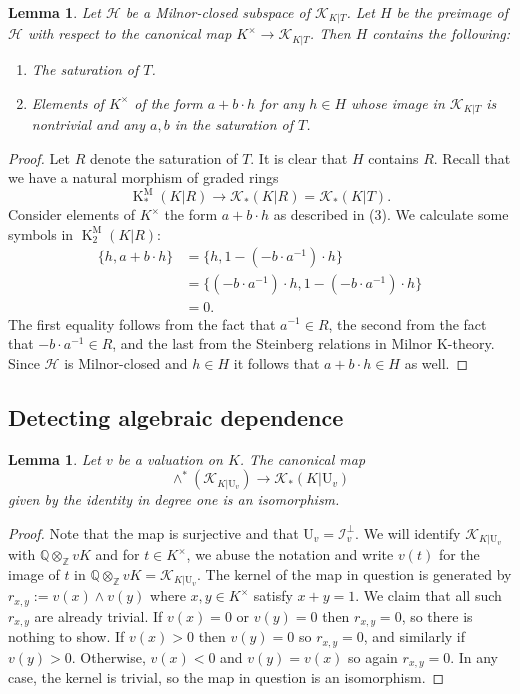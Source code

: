 \documentclass[12pt]{amsart}
\newcommand{\KM}{\operatorname{K}^\mathrm{M}}
\newcommand{\Zbb}{\mathbb{Z}}
\newcommand{\Qbb}{\mathbb{Q}}
\newcommand{\Urm}{\mathrm{U}}
\newcommand{\Ical}{\mathcal{I}}
\newcommand{\Hcal}{\mathcal{H}}
\newcommand{\Kcal}{\mathcal{K}}
\newtheorem{lemma}[theorem]{Lemma}
\theoremstyle{definition}
\begin{document}
\begin{lemma}\label{lemma:milnor_closure_description}
  Let $\Hcal$ be a Milnor-closed subspace of $\Kcal_{K|T}$.
  Let $H$ be the preimage of $\Hcal$ with respect to the canonical map $K^{\times} \to \Kcal_{K|T}$.
  Then $H$ contains the following:
  \begin{enumerate}
    \item The saturation of $T$.
    \item Elements of $K^{\times}$ of the form $a + b \cdot h$ for any $h \in H$ whose image in $\Kcal_{K|T}$ is nontrivial and any $a,b$ in the saturation of $T$.
  \end{enumerate}
\end{lemma}
\begin{proof}
  Let $R$ denote the saturation of $T$.
  It is clear that $H$ contains $R$.
  Recall that we have a natural morphism of graded rings
  \[ \KM_{*}(K|R) \to \Kcal_{*}(K|R) = \Kcal_{*}(K|T). \]
  Consider elements of $K^{\times}$ the form $a + b \cdot h$ as described in (3).
  We calculate some symbols in $\KM_{2}(K|R)$:
  \begin{align*}
    \{h, a + b \cdot h\} &= \{h, 1 - (-b \cdot a^{-1}) \cdot h \} \\
                         &= \{(-b \cdot a^{-1}) \cdot h, 1 - (-b \cdot a^{-1}) \cdot h\} \\
                         &= 0.
  \end{align*}
  The first equality follows from the fact that $a^{-1} \in R$, the second from the fact that $-b \cdot a^{-1} \in R$, and the last from the Steinberg relations in Milnor K-theory.
  Since $\Hcal$ is Milnor-closed and $h \in H$ it follows that $a + b \cdot h \in H$ as well.
\end{proof}

\subsection{Detecting algebraic dependence}

\begin{lemma}\label{lemma:mod_units_exterior}
  Let $v$ be a valuation on $K$.
  The canonical map
  \[ \wedge^{*} (\Kcal_{K|\Urm_{v}}) \to \Kcal_{*}(K|\Urm_{v}) \]
  given by the identity in degree one is an isomorphism.
\end{lemma}
\begin{proof}
  Note that the map is surjective and that $\Urm_{v} = \Ical_{v}^{\perp}$.
  We will identify $\Kcal_{K|\Urm_{v}}$ with $\Qbb \otimes_{\Zbb} vK$ and for $t \in K^{\times}$, we abuse the notation and write $v(t)$ for the image of $t$ in $\Qbb \otimes_{\Zbb} vK = \Kcal_{K|\Urm_{v}}$.
  The kernel of the map in question is generated by $r_{x,y} := v(x) \wedge v(y)$ where $x,y \in K^{\times}$ satisfy $x + y = 1$.
  We claim that all such $r_{x,y}$ are already trivial.
  If $v(x) = 0$ or $v(y) = 0$ then $r_{x,y} = 0$, so there is nothing to show.
  If $v(x) > 0$ then $v(y) = 0$ so $r_{x,y} = 0$, and similarly if $v(y) > 0$.
  Otherwise, $v(x) < 0$ and $v(y) = v(x)$ so again $r_{x,y} = 0$.
  In any case, the kernel is trivial, so the map in question is an isomorphism.
\end{proof}
\end{document}
